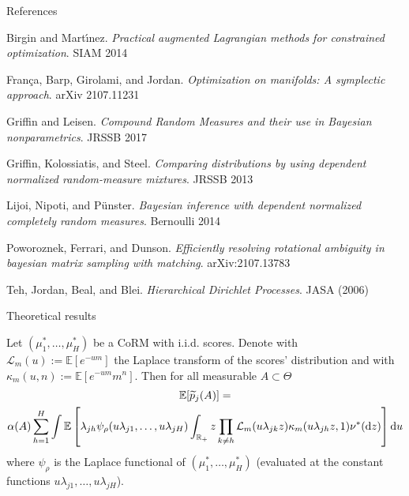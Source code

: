 \documentclass[10.5pt, aspectratio=169]{beamer} %
\newcommand{\E}{\mathbb{E}}
\newcommand{\ptilde}{\widetilde{p}}
\newcommand{\dd}{\mathrm d}
\begin{document}
\begin{frame}{References}

Birgin and Mart{\'\i}nez. \emph{Practical augmented Lagrangian methods for constrained optimization}. SIAM 2014

\medskip
França, Barp, Girolami, and Jordan. \emph{Optimization on manifolds: A symplectic approach}.  arXiv 2107.11231

\medskip
Griffin and Leisen. \emph{Compound Random Measures and their use in Bayesian nonparametrics}. JRSSB 2017

\medskip
Griffin, Kolossiatis, and Steel. \emph{Comparing distributions by using dependent normalized random-measure mixtures}. JRSSB 2013

\medskip
Lijoi, Nipoti, and P{\"u}nster. \emph{Bayesian inference with dependent normalized completely random measures}. Bernoulli 2014

\medskip
Poworoznek, Ferrari, and Dunson. \emph{Efficiently resolving rotational ambiguity in bayesian matrix sampling with matching}. arXiv:2107.13783

\medskip
Teh, Jordan, Beal, and Blei. \emph{Hierarchical Dirichlet Processes}. JASA (2006)

\end{frame}

\addtocounter{framenumber}{-7}

\appendix

\begin{frame}{Theoretical results}

\begin{theorem}\label{teo:expectation}
    Let $(\mu^*_1, \ldots, \mu^*_H)$ be a CoRM with i.i.d. scores. Denote with $\mathcal{L}_m(u) := \E[e^{-u m}]$ the Laplace transform of the scores' distribution and with $\kappa_m(u, n) := \E[e^{-u m} m^n]$.
    Then for all measurable $A \subset \Theta$
    \begin{multline*}
        \E[\ptilde_j(A)] = \\ \alpha(A) \sum_{h=1}^H \int \E\left[ \lambda_{jh}  \psi_{\rho}(u\lambda_{j1}, \ldots, u \lambda_{jH}) \int_{\R_+} z \prod_{k \neq h} \mathcal{L}_m(u \lambda_{jk} z) \kappa_m(u \lambda_{jh} z, 1) \nu^*(\dd z) \right] \dd u 
    \end{multline*}
    where $\psi_{\rho}$ is the Laplace functional of $(\mu^*_1, \ldots, \mu^*_H)$ (evaluated at the constant functions $u\lambda_{j1}, \ldots, u \lambda_{jH}$).
  \end{theorem}
\end{frame}
\end{document}
